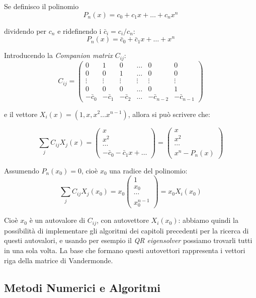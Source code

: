 \medskip\noindent
Se definisco il polinomio
\[
    P_n(x) = c_0 + c_1 x + \dots + c_n x^n
\]

dividendo per $c_n$ e ridefinendo i $\bar c_i = c_i/c_n$:
\[
    P_n(x) = \bar c_0 + \bar c_1 x + \dots + x^n
\]

Introducendo la \textit{Companion matrix} $C_{ij}$:
\[
    C_{ij} = \begin{pmatrix} 
    0 & 1 & 0 & \dots & 0 & 0 \\
    0 & 0 & 1 & \dots & 0 & 0 \\
    \vdots & \vdots & \vdots & \vdots & \vdots & \vdots \\
    0 & 0 & 0 & \dots & 0 & 1\\
    -\bar c_0 & -\bar c_1 & -\bar c_2 & \dots & -\bar c_{n-2} & -\bar c_{n-1}
    \end{pmatrix}
\]

e il vettore $X_i(x) = (1,x,x^2 \dots x^{n-1})$, allora si può scrivere che:

\[
    \sum_j C_{ij} X_j(x) = \begin{pmatrix} x \\ x^2 \\ \cdots \\ -\bar c_0  -\bar c_1 x + \dots \end{pmatrix} = \begin{pmatrix} x \\ x^2 \\ \cdots \\ x^n - P_n(x) \end{pmatrix}
\]

Assumendo $P_n(x_0)=0$, cioè $x_0$ una radice del polinomio:
\[
    \sum_j C_{ij} X_j(x_0) = x_0 \begin{pmatrix} 1 \\ x_0 \\ \cdots \\ x_0^{n-1} \end{pmatrix} = x_0 X_i(x_0)
\]

\noindent Cioè $x_0$ è un autovalore di $C_{ij}$, con autovettore $X_i(x_0)$: abbiamo quindi la possibilità di implementare gli algoritmi dei capitoli precedenti per la ricerca di questi autovalori, e usando per esempio il \textit{QR eigensolver} possiamo trovarli tutti in una sola volta. La base che formano questi autovettori rappresenta i vettori riga della matrice di Vandermonde.

\subsection{Metodi Numerici e Algoritmi}
